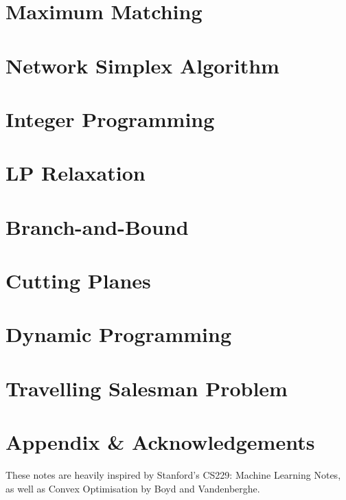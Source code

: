 \documentclass{article}
\begin{document}
\section{Maximum Matching}

\section{Network Simplex Algorithm}

\section{Integer Programming}

\section{LP Relaxation}

\section{Branch-and-Bound}

\section{Cutting Planes}

\section{Dynamic Programming}

\section{Travelling Salesman Problem}

\newpage 
\section*{Appendix \& Acknowledgements}
These notes are heavily inspired by Stanford's CS229: Machine Learning Notes, as well as Convex Optimisation by Boyd and Vandenberghe. 
\end{document}
